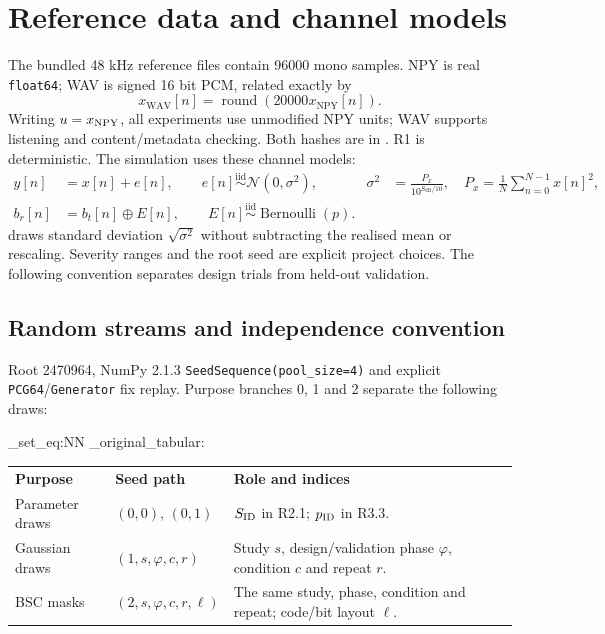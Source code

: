\section{Reference data and channel models}
The bundled 48 kHz reference files contain 96000 mono samples. NPY is real
 \texttt{float64}; WAV is signed 16 bit PCM, related exactly by
\begin{equation}
 x_{\mathrm{WAV}}[n]=\operatorname{round}\!\left(20000x_{\mathrm{NPY}}[n]\right).
 \label{eq:provided-pcm}
\end{equation}
Writing $ u=x_{\rm NPY}$, all experiments use unmodified NPY units; WAV supports listening
and content/metadata checking. Both hashes are in
 . R1 is deterministic. The simulation uses these channel models:
\begin{align}
 y[n]&=x[n]+e[n],\qquad e[n]\overset{\mathrm{iid}}\sim\mathcal N(0,\sigma^2),
 &\sigma^2&=\frac{P_x}{10^{S_{\mathrm{dB}}/10}},
 \quad P_x=\frac1N\sum_{n=0}^{N-1}x[n]^2, \label{eq:noise-contract}\\
 b_r[n]&=b_t[n]\oplus E[n],\qquad
 E[n]\overset{\mathrm{iid}}\sim\operatorname{Bernoulli}(p).
 \label{eq:bsc-contract}
\end{align}
 draws standard deviation $\sqrt{\sigma^2}$ without
subtracting the realised mean or rescaling. Severity ranges and the root seed are explicit project choices. The following
convention separates design trials from held-out validation.

\subsection{Random streams and independence convention}
Root 2470964, NumPy 2.1.3 \texttt{SeedSequence(pool\_size=4)} and
explicit \texttt{PCG64}/\texttt{Generator} fix replay. Purpose branches
0, 1 and 2 separate the following draws:

\begingroup
\ExplSyntaxOn
\cs_set_eq:NN \tabular \report_original_tabular:
\ExplSyntaxOff
\setlength{\tabcolsep}{5pt}
\begin{tabular}{@{}>{\raggedright\arraybackslash}p{28mm}
 >{\raggedright\arraybackslash}p{41mm}
 >{\raggedright\arraybackslash}p{\dimexpr\linewidth-69mm-4\tabcolsep\relax}@{}}
\textbf{Purpose} & \textbf{Seed path} & \textbf{Role and indices} \\[2pt]
Parameter draws & $(0,0)$, $(0,1)$ &
$S_{\rm ID}$ in R2.1; $p_{\rm ID}$ in R3.3. \\[3pt]
Gaussian draws & $(1,s,\varphi,c,r)$ &
Study $s$, design/validation phase $\varphi$, condition $c$ and repeat $r$. \\[3pt]
BSC masks & $(2,s,\varphi,c,r,\ell)$ &
The same study, phase, condition and repeat; code/bit layout $\ell$. \\
\end{tabular}
\par
\endgroup

